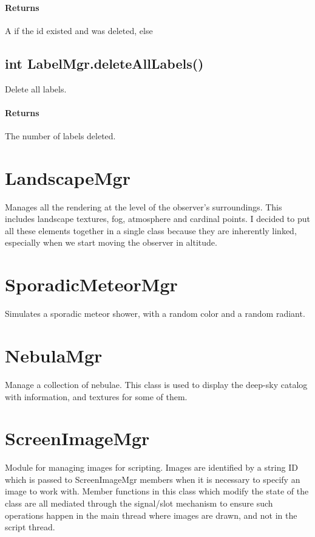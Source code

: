 \paragraph{Returns}
A  if the id existed and was deleted, else 

\subsection{int LabelMgr.deleteAllLabels()}
\label{sec:ScriptingAPI:LabelMgr:deleteAllLabels}
Delete all labels.

\paragraph{Returns}
The number of labels deleted.

\section{LandscapeMgr}
\label{sec:ScriptingAPI:LandscapeMgr}
Manages all the rendering at the level of the observer's surroundings. This includes landscape textures, fog, atmosphere and cardinal points. I decided to put all these elements together in a single class because they are inherently linked, especially when we start moving the observer in altitude.

\section{SporadicMeteorMgr}
\label{sec:ScriptingAPI:SporadicMeteorMgr}
Simulates a sporadic meteor shower, with a random color and a random radiant.

\section{NebulaMgr}
\label{sec:ScriptingAPI:NebulaMgr}
Manage a collection of nebulae. This class is used to display the deep-sky catalog with information, and textures for some of them.

\section{ScreenImageMgr}
\label{sec:ScriptingAPI:ScreenImageMgr}
Module for managing images for scripting. Images are identified by a string ID which is passed to ScreenImageMgr members when it is necessary to specify an image to work with. Member functions in this class which modify the state of the class are all mediated through the signal/slot mechanism to ensure such operations happen in the main thread where images are drawn, and not in the script thread.

